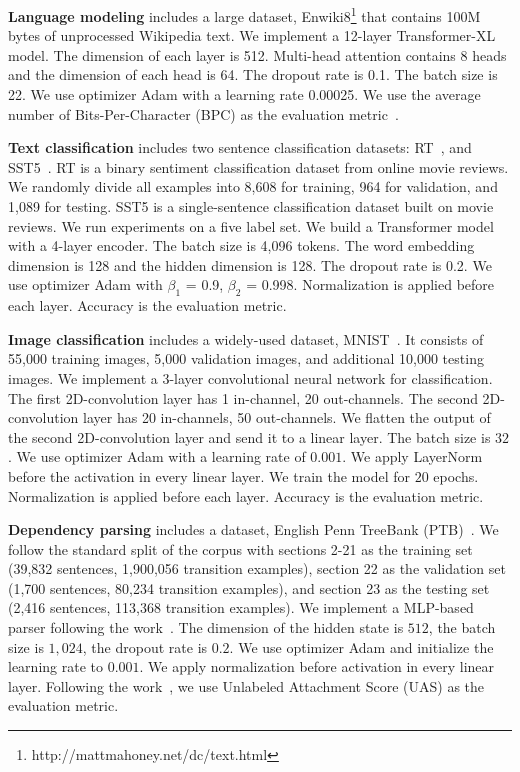 \documentclass{article}
\begin{document}
 \textbf{Language modeling} includes a large dataset, Enwiki8\footnote{http://mattmahoney.net/dc/text.html} that contains 100M bytes of unprocessed Wikipedia text. 
We implement a  12-layer Transformer-XL model. The dimension of each layer is 512. Multi-head attention contains 8 heads and the dimension of each head is 64. The dropout rate is 0.1. The batch size is 22. We use optimizer Adam with a learning rate 0.00025. 
We use the average number of Bits-Per-Character (BPC) as the evaluation metric~\citep{DBLP:journals/corr/abs-1808-04444,dai2019transformer}.  

 \textbf{Text classification} includes two sentence classification datasets:  RT~\citep{PangLee}, and SST5~\citep{socher2013recursive}. RT is a binary  sentiment classification dataset from online movie reviews. We randomly divide all examples into 8,608 for training, 964 for validation, and 1,089 for testing.  SST5 is a single-sentence classification dataset built on movie reviews.  We run experiments on a five label set.   We build a Transformer model with a 4-layer encoder. The batch size is 4,096 tokens. The word embedding dimension is 128 and the hidden dimension is 128. The dropout rate is 0.2.   We use  optimizer Adam with $\beta_1$ = 0.9, $\beta_2$  = 0.998. Normalization is applied before each layer. Accuracy is the evaluation metric. 


 \textbf{Image classification} includes a widely-used dataset, MNIST~\citep{lecun1998gradient}. It consists of 55,000 training images, 5,000 validation images, and additional 10,000 testing images.  We implement a 3-layer convolutional neural network for classification. The first 2D-convolution layer has 1 in-channel, 20 out-channels. The second 2D-convolution layer has 20 in-channels, 50 out-channels. We flatten the output of the second 2D-convolution layer and send it to a linear layer. The batch size is  $32$. We use  optimizer Adam with a learning rate of $0.001$. We apply LayerNorm before the activation in every linear layer. We train the model for $20$ epochs.  Normalization is applied before each layer. Accuracy is the evaluation metric.  
 
 
\textbf{Dependency parsing} includes a dataset, English Penn TreeBank (PTB)~\citep{DBLP:journals/coling/MarcusSM94}.  We follow the standard split of the corpus with sections 2-21 as the training set (39,832 sentences, 1,900,056 transition examples), section 22 as the validation set (1,700 sentences, 80,234 transition examples), and section 23 as the testing set (2,416 sentences, 113,368 transition examples). We implement a  MLP-based parser following the work~\citep{DBLP:conf/emnlp/ChenM14}.   The dimension of the hidden state is $512$, the batch size is $1,024$, the dropout rate is $0.2$. We use optimizer Adam and initialize the learning rate to $0.001$. We apply normalization before activation in every linear layer.  Following the work~\citep{DBLP:conf/emnlp/ChenM14}, we use  Unlabeled Attachment Score (UAS) as the evaluation metric. 
\end{document}
